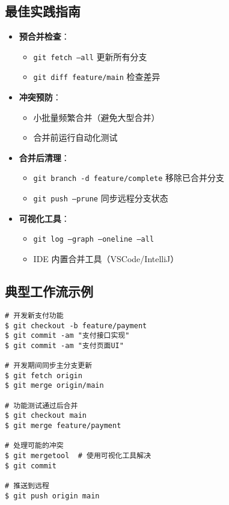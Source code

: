 \subsection{最佳实践指南}
\begin{itemize}[leftmargin=*, nosep]
    \item \textbf{预合并检查}：
    \begin{itemize}[leftmargin=*, nosep]
        \item \texttt{git fetch --all} 更新所有分支
        \item \texttt{git diff feature/main} 检查差异
    \end{itemize}
    
    \item \textbf{冲突预防}：
    
\begin{itemize}[leftmargin=*, nosep]
        \item 小批量频繁合并（避免大型合并）
        \item 合并前运行自动化测试
    \end{itemize}
    
    \item \textbf{合并后清理}：
    
\begin{itemize}[leftmargin=*, nosep]
        \item \texttt{git branch -d feature/complete} 移除已合并分支
        \item \texttt{git push --prune} 同步远程分支状态
    \end{itemize}
    
    \item \textbf{可视化工具}：
    
\begin{itemize}[leftmargin=*, nosep]
        \item \texttt{git log --graph --oneline --all}
        \item IDE 内置合并工具（VSCode/IntelliJ）
    \end{itemize}
\end{itemize}

\subsection{典型工作流示例}
\begin{verbatim}
# 开发新支付功能
$ git checkout -b feature/payment
$ git commit -am "支付接口实现"
$ git commit -am "支付页面UI"

# 开发期间同步主分支更新
$ git fetch origin
$ git merge origin/main

# 功能测试通过后合并
$ git checkout main
$ git merge feature/payment

# 处理可能的冲突
$ git mergetool  # 使用可视化工具解决
$ git commit

# 推送到远程
$ git push origin main
\end{verbatim}

